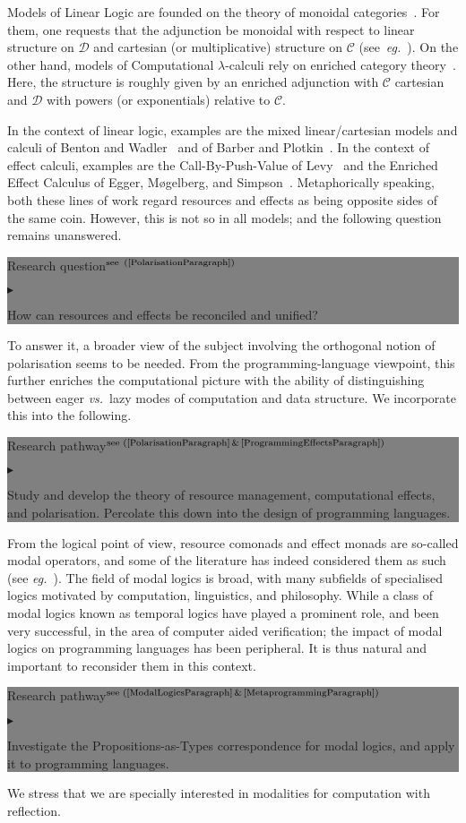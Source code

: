 \documentclass[11pt,twocolumn]{article}
\newenvironment{btritemize}
  {\begin{list}{\btr}
  {\setlength{\topsep}{2pt}
   \setlength{\partopsep}{2pt}
   \setlength{\itemsep}{2.5pt}
   \setlength{\parsep}{2.5pt}
   \setlength{\leftmargin}{1em}
   \setlength{\labelwidth}{.5em}}}
  {\end{list}}
\newcommand{\mytextsf}[1]{\textsf{\small #1}}
\newcommand{\pref}[1]{\,(\ref{#1})}
\newcommand{\eg}{\emph{eg.}}
\newcommand{\vs}{\emph{vs.}}
\newcommand{\btr}{$\blacktriangleright$}
\newcommand{\reqpsize}{8.113395cm}%
\newcommand{\req}[2]{\begin{center}\colorbox{grey}{\begin{minipage}{\reqpsize} 
  \mytextsf{Research question}\hfill$^{\mbox{\scriptsize see #1 }}$\\[-5.5mm]
  \begin{btritemize}
  \item #2
  \end{btritemize}
\end{minipage}}\end{center}}
\newcommand{\rep}[2]{\begin{center}\colorbox{grey}{\begin{minipage}{\reqpsize}
  \mytextsf{Research pathway}\hfill$^{\mbox{\scriptsize see #1 }}$\\[-5.5mm]
  \begin{btritemize}
  \item #2
  \end{btritemize}
\end{minipage}}\end{center}}
\newcommand{\cat}[1]{\mathscr{#1}}
\begin{document}
Models of Linear Logic are founded on the theory of
monoidal categories~\cite[Chapter~VII.1]{MacLane}.  For them, one requests
that the adjunction be monoidal with respect to linear structure on $\cat D$
and cartesian (or multiplicative) structure on $\cat C$
(see~\eg~\cite{MelliesCMLL}).  On the other hand, models of Computational
\mbox{$\lambda$-calculi} rely on enriched category theory~\cite{KellyBook}.
Here, the structure is roughly given by an enriched adjunction with $\cat C$
cartesian and $\cat D$ with powers (or exponentials) relative to $\cat C$.

In the context of linear logic, examples are the mixed linear/cartesian models
and calculi of Benton and Wadler~\cite{BentonWadler} and of Barber and
Plotkin~\cite{BarberPlotkin}.  In the context of effect calculi, examples are
the Call-By-Push-Value of Levy~\cite{LevyCBPV} and the Enriched Effect
Calculus of Egger, M{\o}gelberg, and Simpson~\cite{EEC}.  Metaphorically
speaking, both these lines of work regard resources and effects as being
opposite sides of the same coin.  However, this is not so in all models;
and the following question remains unanswered.
%
\req{\pref{PolarisationParagraph}}
  {How can resources and effects be reconciled and unified?}
%
To answer it, a broader view of the subject involving the orthogonal
notion of polarisation seems to be needed.  From the programming-language
viewpoint, this further enriches the computational picture with the
ability of distinguishing between eager \vs~lazy modes of computation and
data structure.  We incorporate this into the following.
%
\rep{(\ref{PolarisationParagraph}\,\&\,\ref{ProgrammingEffectsParagraph})}
  {Study and develop the theory of resource management, computational
    effects, and polarisation.  Percolate this down into the design of
    programming languages.}

From the logical point of view, resource comonads and effect monads are
so-called modal operators, and some of the literature has indeed
considered them as such (see \eg~\cite{Kobayashi}).  %
The field of modal logics is broad, with many subfields of specialised
logics motivated by computation, linguistics, and philosophy.  While a
class of modal logics known as temporal logics have played a prominent
role, and been very successful, in the area of computer aided verification;
the impact of modal logics on programming languages has been peripheral.
It is thus natural and important to reconsider them in this context. 
%
\rep{(\ref{ModalLogicsParagraph}\,\&\,\ref{MetaprogrammingParagraph})}
  {Investigate the Propositions-as-Types 
    correspondence %
    for modal logics, and apply it to programming languages.}
We stress that we are specially interested in modalities for computation with
reflection.
\end{document}

